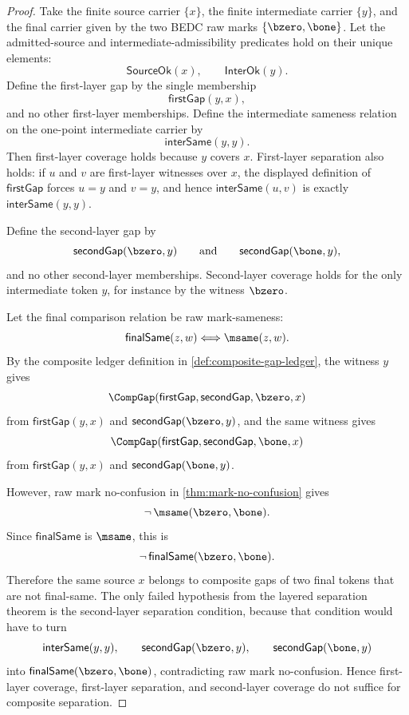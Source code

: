 \begin{proof}
Take the finite source carrier $\{x\}$, the finite intermediate carrier $\{y\}$, and the final carrier given by the two BEDC raw marks $\{\bzero,\bone\}$. Let the admitted-source and intermediate-admissibility predicates hold on their unique elements:
$$
  \mathsf{SourceOk}(x),
  \qquad
  \mathsf{InterOk}(y).
$$
Define the first-layer gap by the single membership
$$
  \mathsf{firstGap}(y,x),
$$
and no other first-layer memberships. Define the intermediate sameness relation on the one-point intermediate carrier by
$$
  \mathsf{interSame}(y,y).
$$
Then first-layer coverage holds because $y$ covers $x$. First-layer separation also holds: if $u$ and $v$ are first-layer witnesses over $x$, the displayed definition of $\mathsf{firstGap}$ forces $u=y$ and $v=y$, and hence $\mathsf{interSame}(u,v)$ is exactly $\mathsf{interSame}(y,y)$.

Define the second-layer gap by
$$
  \mathsf{secondGap}(\bzero,y)
  \qquad\text{and}\qquad
  \mathsf{secondGap}(\bone,y),
$$
and no other second-layer memberships. Second-layer coverage holds for the only intermediate token $y$, for instance by the witness $\bzero$.

Let the final comparison relation be raw mark-sameness:
$$
  \mathsf{finalSame}(z,w)
  \Longleftrightarrow
  \msame(z,w).
$$
By the composite ledger definition in \autoref{def:composite-gap-ledger}, the witness $y$ gives
$$
  \CompGap(\mathsf{firstGap},\mathsf{secondGap},\bzero,x)
$$
from $\mathsf{firstGap}(y,x)$ and $\mathsf{secondGap}(\bzero,y)$, and the same witness gives
$$
  \CompGap(\mathsf{firstGap},\mathsf{secondGap},\bone,x)
$$
from $\mathsf{firstGap}(y,x)$ and $\mathsf{secondGap}(\bone,y)$.

However, raw mark no-confusion in \autoref{thm:mark-no-confusion} gives
$$
  \neg\,\msame(\bzero,\bone).
$$
Since $\mathsf{finalSame}$ is $\msame$, this is
$$
  \neg\,\mathsf{finalSame}(\bzero,\bone).
$$
Therefore the same source $x$ belongs to composite gaps of two final tokens that are not final-same. The only failed hypothesis from the layered separation theorem is the second-layer separation condition, because that condition would have to turn
$$
  \mathsf{interSame}(y,y),
  \qquad
  \mathsf{secondGap}(\bzero,y),
  \qquad
  \mathsf{secondGap}(\bone,y)
$$
into $\mathsf{finalSame}(\bzero,\bone)$, contradicting raw mark no-confusion. Hence first-layer coverage, first-layer separation, and second-layer coverage do not suffice for composite separation.
\end{proof}
